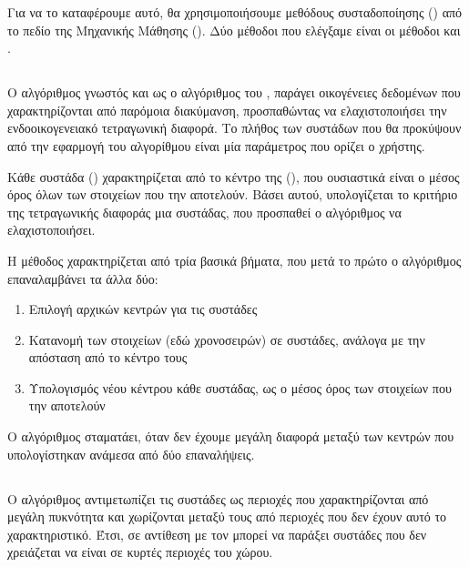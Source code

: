 Για να το καταφέρουμε αυτό, θα χρησιμοποιήσουμε μεθόδους συσταδοποίησης () από το πεδίο της Μηχανικής Μάθησης (). Δύο μέθοδοι που ελέγξαμε είναι οι μέθοδοι  και . 

\subsection{}

Ο αλγόριθμος  γνωστός και ως ο αλγόριθμος του , παράγει οικογένειες δεδομένων που χαρακτηρίζονται από παρόμοια διακύμανση, προσπαθώντας να ελαχιστοποιήσει την ενδοοικογενειακό τετραγωνική διαφορά. Το πλήθος των συστάδων που θα προκύψουν από την εφαρμογή του αλγορίθμου είναι μία παράμετρος που ορίζει ο χρήστης.

Κάθε συστάδα () χαρακτηρίζεται από το κέντρο της (), που ουσιαστικά είναι ο μέσος όρος όλων των στοιχείων που την αποτελούν. Βάσει αυτού, υπολογίζεται το κριτήριο της τετραγωνικής διαφοράς μια συστάδας, που προσπαθεί ο αλγόριθμος να ελαχιστοποιήσει.

Η μέθοδος χαρακτηρίζεται από τρία βασικά βήματα, που μετά το πρώτο ο αλγόριθμος επαναλαμβάνει τα άλλα δύο:

\begin{enumerate}
    \item Επιλογή αρχικών κεντρών για τις συστάδες
    \item Κατανομή των στοιχείων (εδώ χρονοσειρών) σε συστάδες, ανάλογα με την απόσταση από το κέντρο τους
    \item Υπολογισμός νέου κέντρου κάθε συστάδας, ως ο μέσος όρος των στοιχείων που την αποτελούν
\end{enumerate}

Ο αλγόριθμος σταματάει, όταν δεν έχουμε μεγάλη διαφορά μεταξύ των κεντρών που υπολογίστηκαν ανάμεσα από δύο επαναλήψεις. 

\subsection{}

Ο αλγόριθμος  αντιμετωπίζει τις συστάδες ως περιοχές που χαρακτηρίζονται από μεγάλη πυκνότητα και χωρίζονται μεταξύ τους από περιοχές που δεν έχουν αυτό το χαρακτηριστικό. Έτσι, σε αντίθεση με τον  μπορεί να παράξει συστάδες που δεν χρειάζεται να είναι σε κυρτές περιοχές του χώρου.

